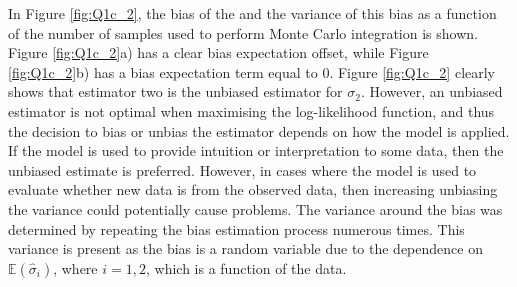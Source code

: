 \documentclass{article}
\begin{document}
 In Figure \ref{fig:Q1c_2}, the bias of the and the variance of this bias as a function of the number of samples used to perform Monte Carlo integration is shown. Figure \ref{fig:Q1c_2}a) has a clear bias expectation offset, while Figure \ref{fig:Q1c_2}b) has a bias expectation term equal to 0. Figure \ref{fig:Q1c_2} clearly shows that estimator two is the unbiased estimator for $\sigma_2$. However, an unbiased estimator is not optimal when maximising the log-likelihood function, and thus the decision to bias or unbias the estimator depends on how the model is applied. If the model is used to provide intuition or interpretation to some data, then the unbiased estimate is preferred. However, in cases where the model is used to evaluate whether new data is from the observed data, then increasing unbiasing the variance could potentially cause problems. The variance around the bias was determined by repeating the bias estimation process numerous times. This variance is present as the bias is a random variable due to the dependence on $\mathbb{E}\left(\hat{\sigma}_{i}\right)$, where $i = 1, 2$, which is a function of the data.
\end{document}
